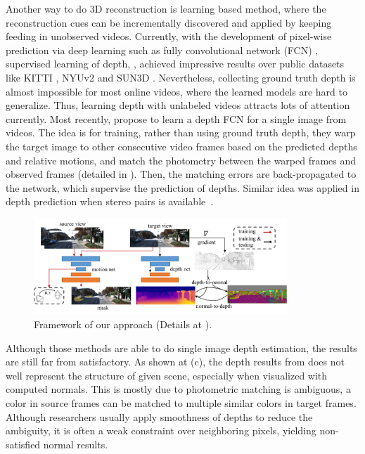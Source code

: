 Another way to do 3D reconstruction is learning based method, where the reconstruction cues can be incrementally discovered and applied by keeping feeding in unobserved videos. Currently, with the development of pixel-wise prediction via deep learning such as fully convolutional network (FCN) \cite{long2015fully}, supervised learning of depth, \eg \cite{eigen2014depth,ummenhofer2016demon}, achieved impressive results over public datasets like KITTI \cite{geiger2012we}, NYUv2 \cite{silberman2012indoor} and SUN3D \cite{xiao2013sun3d}. 
Nevertheless, collecting ground truth depth is almost impossible for most online videos, where the learned models are hard to generalize. 
Thus, learning depth with unlabeled videos attracts lots of attention currently. Most recently,
\cite{zhou2017unsupervised} propose to learn a depth FCN for a single image from videos. The idea is for training, rather than using ground truth depth, they warp the target image to other consecutive video frames based on the predicted depths and relative motions, and match the photometry between the warped frames and observed frames (detailed in ). Then, the matching errors are back-propagated to the network, which supervise the prediction of depths. Similar idea was applied in depth prediction when stereo pairs is available~\cite{GargBR16,godard2016unsupervised}.
\begin{figure}[t]
\centering
\includegraphics[width=0.85\textwidth]{figures/pipeline_comp.pdf}
\caption{Framework of our approach (Details at ).}
\label{fig:pipeline}
\vspace{-1.3\baselineskip}
\end{figure}

Although those methods are able to do single image depth estimation, the results are still far from satisfactory. As shown at (c), the depth results from \cite{zhou2017unsupervised} does not well represent the structure of given scene, especially when visualized with computed normals. 
This is mostly due to photometric matching is ambiguous, \ie a color in source frames can be matched to multiple similar colors in target frames. Although researchers usually apply smoothness of depths \cite{zhou2017unsupervised} to reduce the ambiguity, it is often a weak constraint over neighboring pixels, yielding non-satisfied normal results.


